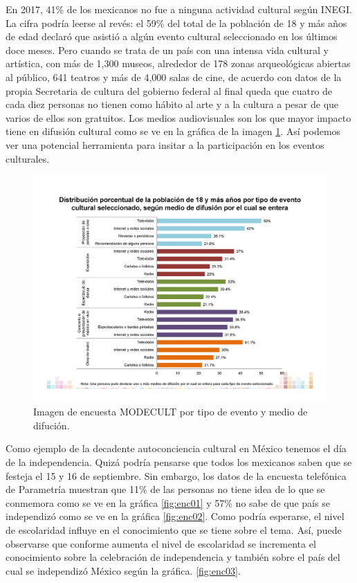 En 2017, 41\% de los mexicanos no fue a ninguna actividad cultural según INEGI\cite{pp02}. La cifra podría leerse al revés: el 59\% del total de la población de 18 y más años de edad declaró que asistió a algún evento cultural seleccionado en los últimos doce meses. Pero cuando se trata de un país con una intensa vida cultural y artística, con más de 1,300 museos, alrededor de 178 zonas arqueológicas abiertas al público, 641 teatros y más de 4,000 salas de cine, de acuerdo con datos de la propia Secretaria de cultura del gobierno federal\cite{pp01} al final queda que cuatro de cada diez personas no tienen como hábito al arte y a la cultura a pesar de que varios de ellos son gratuitos. Los medios audiovisuales son los que mayor impacto tiene en difusión cultural como se ve en la gráfica de la imagen \ref{fig:modecult}. Así podemos ver una potencial herramienta para insitar a la participación en los eventos culturales.  
\\[1pt]

\begin{figure}
	\centering 
	\includegraphics[width=.75\textwidth]{03MarcoTeorico/imageR/modecult.jpg}
	\caption{Imagen de encuesta MODECULT por tipo de evento y medio de difución.}
	\label{fig:modecult}
\end{figure}

Como ejemplo de la decadente autoconciencia cultural en México tenemos el día de la independencia. Quizá podría pensarse que todos los mexicanos saben que se festeja el 15 y 16 de septiembre. Sin embargo, los datos de la encuesta telefónica de Parametría\cite{pp03} muestran que 11\% de las personas no tiene idea de lo que se conmemora como se ve en la gráfica \ref{fig:enc01} y 57\% no sabe de que país se independizó como se ve en la gráfica \ref{fig:enc02}. Como podría esperarse, el nivel de escolaridad influye en el conocimiento que se tiene sobre el tema. Así, puede observarse que conforme aumenta el nivel de escolaridad se incrementa el conocimiento sobre la celebración de independencia y también sobre el país del cual se independizó México según la gráfica. \ref{fig:enc03}.
\\[1pt]




